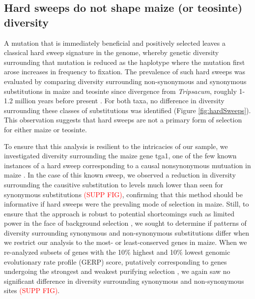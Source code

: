 \documentclass{pnastwo}
\begin{document}
\begin{article}
\subsection{Hard sweeps do not shape maize (or teosinte) diversity}
A mutation that is immediately beneficial and positively selected leaves a classical hard
sweep signature in the genome, whereby genetic diversity surrounding
that mutation is reduced as the haplotype where the mutation first
arose increases in frequency to fixation. The prevalence of such hard
sweeps was evaluated by comparing diversity
surrounding non-synonymous and synonymous substitutions in maize and
teosinte since divergence from \emph{Tripsacum}, roughly 1-1.2 million years before
present \cite{ross2009}. For both taxa, no difference in diversity
surrounding these classes of substitutions was identified (Figure
\ref{fig:hardSweeps}). This observation suggests that hard sweeps are not a primary form of
selection for either maize or teosinte.

To ensure that this analysis is resilient to the intricacies of our sample, we investigated diversity surrounding the maize gene tga1, one of the few known instances of a hard sweep corresponding to a causal nonsynonymous mutuation in maize \cite{wang2015}. In the case of this known sweep, we observed a reduction in diversity surrounding the causitive substitution to levels much lower than seen for synonymous substitutions \textcolor{red}{(SUPP FIG)}, confirming that this method should be informative if hard sweeps were the prevaling mode of selection in maize. Still, to ensure that the approach is robust to potential shortcomings such as limited power in the face of background selection \cite{enard2014}, we sought to determine if patterns of diversity surrounding synonymous and non-synonymous substitutions differ when we restrict our analysis to the most- or least-conserved genes in maize. When we re-analyzed subsets of genes with the 10\% highest and 10\% lowest genomic evolutionary rate profile (GERP) score, putatively corresponding to genes undergoing the strongest and weakest purifying selection \cite{davydov2010, cooper2005, rodgers2015}, we again saw no significant difference in diversity surrounding synonymous and non-synonymous sites \textcolor{red}{(SUPP FIG)}.


\end{article}
\end{document}
